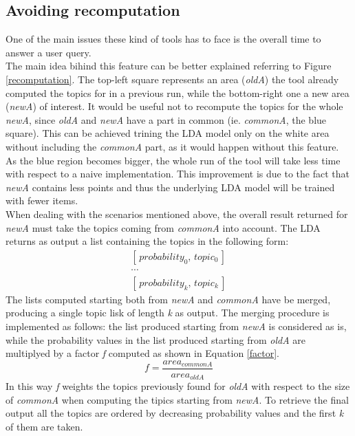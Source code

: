 \documentclass{sig-alternate-05-2015}
\begin{document}
\subsection{Avoiding recomputation}\label{avoidingRecomputation}
One of the main issues these kind of tools has to face is the overall time to answer a user query.\\
The main idea bihind this feature can be better explained referring to Figure \ref{recomputation}. The top-left square represents an area (\emph{oldA}) the tool already computed the topics for in a previous run, while the bottom-right one a new area (\emph{newA}) of interest. It would be useful not to recompute the topics for the whole \emph{newA}, since \emph{oldA} and \emph{newA} have a part in common (ie. \emph{commonA}, the blue square). This can be achieved trining the LDA model only on the white area without including the \emph{commonA} part, as it would happen without this feature. As the blue region becomes bigger, the whole run of the tool will take less time with respect to a naive implementation. This improvement is due to the fact that \emph{newA} contains less points and thus the underlying LDA model will be trained with fewer items.\\
When dealing with the scenarios mentioned above, the overall result returned for \emph{newA} must take the topics coming from \emph{commonA} into account. The LDA returns as output a list containing the topics in the following form:
\begin{equation}
    \begin{split}
        [\,probability_0,\,topic_0\,] \\
        \cdots \\
        [\,probability_k,\,topic_k\,]
    \end{split}
\end{equation}
The lists computed starting both from \emph{newA} and \emph{commonA} have be merged, producing a single topic lisk of length \emph{k} as output. The merging procedure is implemented as follows: the list produced starting from \emph{newA} is considered as is, while the probability values in the list produced starting from \emph{oldA} are multiplyed by a factor \emph{f} computed as shown in Equation \ref{factor}.
\begin{equation}\label{factor}
    f = \frac{area_{commonA}}{area_{oldA}}
\end{equation}
In this way \emph{f} weights the topics previously found for \emph{oldA} with respect to the size of \emph{commonA} when computing the tipics starting from \emph{newA}. To retrieve the final output all the topics are ordered by decreasing probability values and  the first \emph{k} of them are taken.
\end{document}
